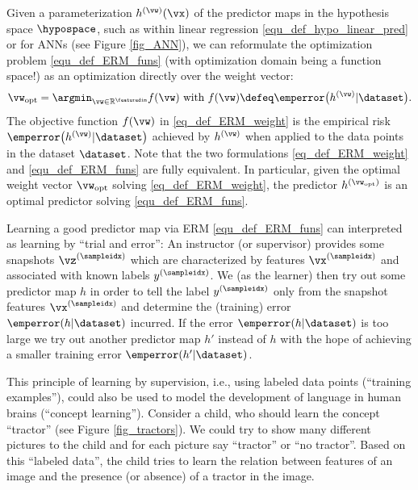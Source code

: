 \documentclass[12pt]{report}
\begin{document}
Given a parameterization $h^{(\vw)}(\vx)$ of the predictor maps in the hypothesis space $\hypospace$, such as within 
linear regression \eqref{equ_def_hypo_linear_pred} or for ANNs (see Figure \ref{fig_ANN}), %
we can reformulate the optimization problem \eqref{equ_def_ERM_funs} (with optimization 
domain being a function space!) as an optimization directly over the weight vector:
\begin{equation}
\label{eq_def_ERM_weight}
    \vw_{\rm opt} = \argmin_{\vw \in \mathbb{R}^{\featuredim}} f(\vw) \mbox{ with } f(\vw) \defeq \emperror\big(h^{(\vw)} |\dataset\big). 
\end{equation}
The objective function $f(\vw)$ in \eqref{eq_def_ERM_weight} is the empirical risk $\emperror\big(h^{(\vw)} |\dataset\big)$ achieved by $h^{(\vw)}$ 
when applied to the data points in the dataset $\dataset$. Note that the two formulations \eqref{eq_def_ERM_weight} and \eqref{equ_def_ERM_funs} 
are fully equivalent. In particular, given the optimal weight vector $\vw_{\rm opt}$ solving 
\eqref{eq_def_ERM_weight}, the predictor $h^{(\vw_{\rm opt})}$ is an optimal predictor solving \eqref{equ_def_ERM_funs}. 

Learning a good predictor map via ERM \eqref{equ_def_ERM_funs} can interpreted as 
learning by ``trial and error'': An instructor (or supervisor) provides some snapshots 
$\vz^{(\sampleidx)}$ which are characterized by features $\vx^{(\sampleidx)}$ and associated 
with known labels $y^{(\sampleidx)}$. We (as the learner) then try out some predictor map $h$ 
in order to tell the label $y^{(\sampleidx)}$ only from the snapshot features $\vx^{(\sampleidx)}$ 
and determine the (training) error $\emperror(h|\dataset)$ incurred. If the error $\emperror(h|\dataset)$ 
is too large we try out another predictor map $h'$ instead of $h$ with the hope of achieving 
a smaller training error $\emperror(h'|\dataset)$. 


This principle of learning by supervision, i.e., using labeled data points (``training examples''), could 
also be used to model the development of language in human brains (``concept learning''). Consider a 
child, who should learn the concept ``tractor'' (see Figure \ref{fig_tractors}). We could try to show 
many different pictures to the child and for each picture say ``tractor'' or ``no tractor''. Based on this 
``labeled data'', the child tries to learn the relation between features of an image and the presence 
(or absence) of a tractor in the image. 
\end{document}
